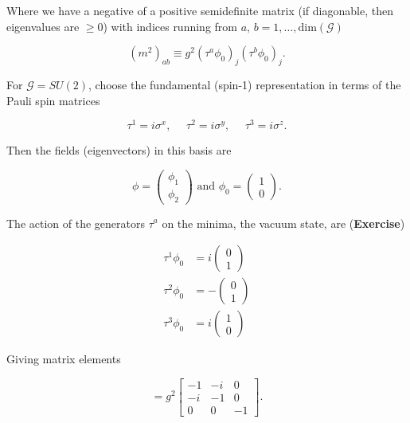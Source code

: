 \noindent Where we have a negative of a positive semidefinite matrix (if diagonable, then eigenvalues are $\ge 0$) with indices running from $a, \, b = 1, \dots, \text{dim}(\mathcal{G})$

\begin{equation}
(m^2)_{ab} \equiv g^2 (\tau^a \phi_0 )_j (\tau^b \phi_0)_j.
\end{equation}

\noindent For $\mathcal{G} = SU(2)$, choose the fundamental (spin-1) representation in terms of the Pauli spin matrices

\begin{equation}
\tau^1 = i \sigma^x, \,\,\,\,\,\,\,\, \tau^2 = i \sigma^y , \,\,\,\,\,\,\,\, \tau^3 = i \sigma^z.
\end{equation}

\noindent Then the fields (eigenvectors) in this basis are

\begin{equation}
\phi = \begin{pmatrix} \phi_1 \\ \phi_2 \end{pmatrix} \text{ and } \phi_0 = \begin{pmatrix} 1 \\ 0 \end{pmatrix}.
\end{equation}

\noindent The action of the generators $\tau^a$ on the minima, the vacuum state, are (\textbf{Exercise})

\begin{align}
\tau^1 \phi_0 &= i \begin{pmatrix} 0 \\ 1 \end{pmatrix} \\
\tau^2 \phi_0 &= - \begin{pmatrix} 0 \\ 1 \end{pmatrix} \\
\tau^3 \phi_0 &= i \begin{pmatrix} 1 \\ 0 \end{pmatrix} 
\end{align}

\noindent Giving matrix elements

\begin{equation}
[m^2] = g^2
\begin{bmatrix}
 -1 & -i & 0 \\
 -i & -1 & 0 \\
  0 & 0 & -1
\end{bmatrix}.
\end{equation}

